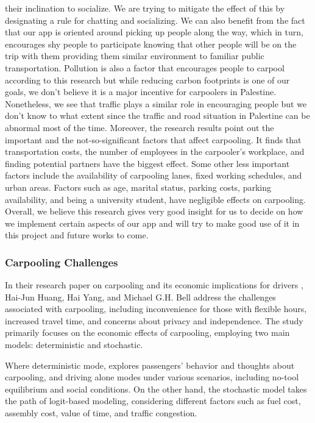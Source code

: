 \documentclass[a4paper, 12pt]{article} %
\begin{document}
their inclination to socialize. We are trying to mitigate the effect of this by designating a rule for chatting and socializing. We can also benefit from the fact that our app is oriented around picking up people along the way, which in turn, encourages shy people to participate knowing that other people will be on the trip with them providing them similar environment to familiar public transportation. Pollution is also a factor that encourages people to carpool according to this research but while reducing carbon footprints is one of our goals, we don't believe it is a major incentive for carpoolers in Palestine. Nonetheless, we see that traffic plays a similar role in encouraging people but we don't know to what extent since the traffic and road situation in Palestine can be abnormal most of the time. Moreover, the research results point out the important and the not-so-significant factors that affect carpooling. It finds that transportation costs, the number of employees in the carpooler's workplace, and finding potential partners have the biggest effect. Some other less important factors include the availability of carpooling lanes, fixed working schedules, and urban areas. Factors such as age, marital status, parking costs, parking availability, and being a university student,  have negligible effects on carpooling. \cite{soton381789} Overall, we believe this research gives very good insight for us to decide on how we implement certain aspects of our app and will try to make good use of it in this project and future works to come.

            \subsubsection{Carpooling Challenges}
                In their research paper on carpooling and its economic implications for drivers \cite{carpool_challenge}, Hai-Jun Huang, Hai Yang, and Michael G.H. Bell address the challenges associated with carpooling, including inconvenience for those with flexible hours, increased travel time, and concerns about privacy and independence. The study primarily focuses on the economic effects of carpooling, employing two main models: deterministic and stochastic.
                
                Where deterministic mode, explores passengers’ behavior and thoughts about carpooling, and driving alone modes under various scenarios, including no-tool equilibrium and social conditions. On the other hand, the stochastic model takes the path of logit-based modeling, considering different factors such as fuel cost, assembly cost, value of time, and traffic congestion.
                
\end{document}
